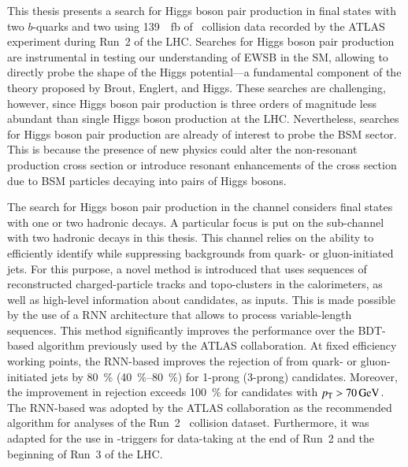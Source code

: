 This thesis presents a search for Higgs boson pair production in final states
with two $b$-quarks and two \tauleptons using \SI{139}{\per\femto\barn} of
\pp~collision data recorded by the ATLAS experiment during Run~2 of the
LHC. Searches for Higgs boson pair production are instrumental in testing our
understanding of EWSB in the SM, allowing to directly probe the shape of the
Higgs potential---a fundamental component of the theory proposed by Brout,
Englert, and Higgs. These searches are challenging, however, since Higgs boson
pair production is three orders of magnitude less abundant than single Higgs
boson production at the LHC. Nevertheless, searches for Higgs boson pair
production are already of interest to probe the BSM sector. This is because the
presence of new physics could alter the non-resonant \HH production cross
section or introduce resonant enhancements of the cross section due to BSM
particles decaying into pairs of Higgs bosons.


The search for Higgs boson pair production in the \bbtautau channel considers
final states with one or two hadronic \taulepton decays. A particular focus is
put on the sub-channel with two hadronic \taulepton decays in this thesis. This
channel relies on the ability to efficiently identify \tauhadvis while
suppressing backgrounds from quark- or gluon-initiated jets. For this purpose, a
novel \tauid method is introduced that uses sequences of reconstructed
charged-particle tracks and topo-clusters in the calorimeters, as well as
high-level information about \tauhadvis candidates, as inputs. This is made
possible by the use of a RNN architecture that allows to process variable-length
sequences. This method significantly improves the \tauid performance over the
BDT-based algorithm previously used by the ATLAS collaboration. At fixed
\tauhadvis efficiency working points, the RNN-based \tauid improves the
rejection of \faketauhadvis from quark- or gluon-initiated jets by
\SI{80}{\percent} (\SIrange{40}{80}{\percent}) for 1-prong (3-prong) \tauhadvis
candidates. Moreover, the improvement in \faketauhadvis rejection exceeds
\SI{100}{\percent} for candidates with $\pT > \SI{70}{\GeV}$. The RNN-based
\tauid was adopted by the ATLAS collaboration as the recommended \tauid
algorithm for analyses of the Run~2 \pp~collision dataset. Furthermore, it was
adapted for the use in \tauhadvis-triggers for data-taking at the end of Run~2
and the beginning of Run~3 of the LHC.


